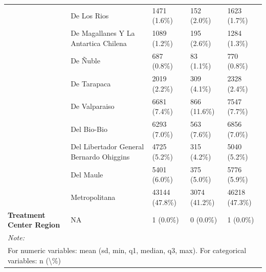 \documentclass[
  spanish,
  10pt,
]{article}
\begin{document}
\begin{table}[H]
{\begin{tabular}[t]{>{}lllll}
 & De Los Rios & 1471 (1.6\%) & 152 (2.0\%) & 1623 (1.7\%)\\
\cmidrule{2-5}
 & De Magallanes Y La Antartica Chilena & 1089 (1.2\%) & 195 (2.6\%) & 1284 (1.3\%)\\
\cmidrule{2-5}
 & De Ñuble & 687 (0.8\%) & 83 (1.1\%) & 770 (0.8\%)\\
\cmidrule{2-5}
 & De Tarapaca & 2019 (2.2\%) & 309 (4.1\%) & 2328 (2.4\%)\\
\cmidrule{2-5}
 & De Valparaiso & 6681 (7.4\%) & 866 (11.6\%) & 7547 (7.7\%)\\
\cmidrule{2-5}
 & Del Bio-Bio & 6293 (7.0\%) & 563 (7.6\%) & 6856 (7.0\%)\\
\cmidrule{2-5}
 & Del Libertador General  Bernardo Ohiggins & 4725 (5.2\%) & 315 (4.2\%) & 5040 (5.2\%)\\
\cmidrule{2-5}
 & Del Maule & 5401 (6.0\%) & 375 (5.0\%) & 5776 (5.9\%)\\
\cmidrule{2-5}
 & Metropolitana & 43144 (47.8\%) & 3074 (41.2\%) & 46218 (47.3\%)\\
\cmidrule{2-5}
\multirow[t]{-17}{*}{\raggedright\arraybackslash \textbf{Treatment Center Region}} & NA & 1 (0.0\%) & 0 (0.0\%) & 1 (0.0\%)\\
\bottomrule
\multicolumn{5}{l}{\rule{0pt}{1em}\textit{Note: }}\\
\multicolumn{5}{l}{\rule{0pt}{1em}For numeric variables: mean (sd, min, q1, median, q3, max). For categorical variables: n (\textbackslash{}\%)}\\
\end{tabular}}
\end{table}
\end{document}
